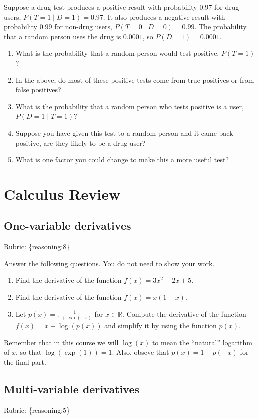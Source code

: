 \documentclass{article}
\def\rubric#1{\gre{Rubric: \{#1\}}}{}
\def\blu#1{{\color{blu}#1}}
\def\gre#1{{\color{gre}#1}}
\def\R{\mathbb{R}}
\begin{document}
Suppose a drug test produces a positive result with probability $0.97$ for drug users, $P(T=1 \mid D=1)=0.97$. It also produces a negative result with probability $0.99$ for non-drug users, $P(T=0 \mid D=0)=0.99$. The probability that a random person uses the drug is $0.0001$, so $P(D=1)=0.0001$.

\begin{enumerate}
\item What is the probability that a random person would test positive, $P(T=1)$?
\item In the above, do most of these positive tests come from true positives or from false positives?
\item What is the probability that a random person who tests positive is a user, $P(D=1 \mid T=1)$?
\item Suppose you have given this test to a random person and it came back positive, are they likely to be a drug user?
\item What is one factor you could change to make this a more useful test?
\end{enumerate}


\section{Calculus Review}



\subsection{One-variable derivatives}
\label{sub.one.var}
\rubric{reasoning:8}

\blu{Answer the following questions.} You do not need to show your work.

\begin{enumerate}
\item Find the derivative of the function $f(x) = 3x^2 -2x + 5$.
\item Find the derivative of the function $f(x) = x(1-x)$.
\item Let $p(x) = \frac{1}{1+\exp(-x)}$ for $x \in \R$. Compute the derivative of the function $f(x) = x-\log(p(x))$ and simplify it by using the function $p(x)$.
\end{enumerate}
Remember that in this course we will $\log(x)$ to mean the ``natural'' logarithm of $x$, so that $\log(\exp(1)) = 1$. Also, obseve that $p(x) = 1-p(-x)$ for the final part.

\subsection{Multi-variable derivatives}
\label{sub.multi.var}
\rubric{reasoning:5}
\end{document}
